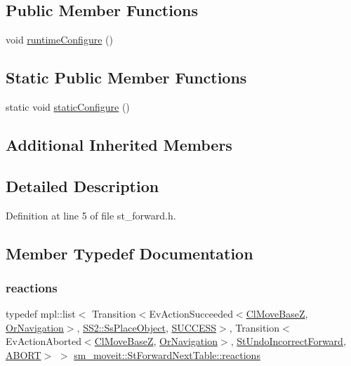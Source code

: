 \subsection*{Public Member Functions}
\begin{DoxyCompactItemize}
\item 
void \hyperlink{structsm__moveit_1_1StForwardNextTable_a4f6c466efdb91b0eb9aaee71f87a4fc4}{runtime\+Configure} ()
\end{DoxyCompactItemize}
\subsection*{Static Public Member Functions}
\begin{DoxyCompactItemize}
\item 
static void \hyperlink{structsm__moveit_1_1StForwardNextTable_a2f28979d2a049e53b91802421771bcfb}{static\+Configure} ()
\end{DoxyCompactItemize}
\subsection*{Additional Inherited Members}


\subsection{Detailed Description}


Definition at line 5 of file st\+\_\+forward.\+h.



\subsection{Member Typedef Documentation}
\mbox{\label{structsm__moveit_1_1StForwardNextTable_a00ed94e86d9c85581a167cfdf8e9dbfe}} 
\subsubsection{\texorpdfstring{reactions}{reactions}}
{\footnotesize\ttfamily typedef mpl\+::list$<$ Transition$<$Ev\+Action\+Succeeded$<$\hyperlink{classcl__move__base__z_1_1ClMoveBaseZ}{Cl\+Move\+BaseZ}, \hyperlink{classsm__moveit_1_1OrNavigation}{Or\+Navigation}$>$, \hyperlink{structsm__moveit_1_1SS2_1_1SsPlaceObject}{S\+S2\+::\+Ss\+Place\+Object}, \hyperlink{classSUCCESS}{S\+U\+C\+C\+E\+SS}$>$, Transition$<$Ev\+Action\+Aborted$<$\hyperlink{classcl__move__base__z_1_1ClMoveBaseZ}{Cl\+Move\+BaseZ}, \hyperlink{classsm__moveit_1_1OrNavigation}{Or\+Navigation}$>$, \hyperlink{structsm__moveit_1_1StUndoIncorrectForward}{St\+Undo\+Incorrect\+Forward}, \hyperlink{classABORT}{A\+B\+O\+RT}$>$ $>$ \hyperlink{structsm__moveit_1_1StForwardNextTable_a00ed94e86d9c85581a167cfdf8e9dbfe}{sm\+\_\+moveit\+::\+St\+Forward\+Next\+Table\+::reactions}}



